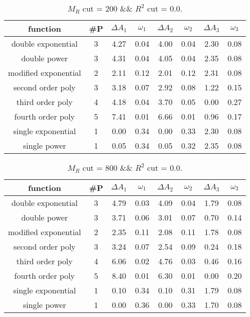  
\begin{table}[H] 
\begin{center} 
\begin{tabular}{|c|c|cc|cc|cc|} 
\hline function & \#P & $\Delta A_1$ & $\omega_1$ & $\Delta A_2$ & $\omega_2$ & $\Delta A_3$ & $\omega_3$ \\ \hline 
double exponential &  3 &   4.27 &   0.04 &   4.00 &   0.04 &   2.30 &   0.08 \\ 
double power &  3 &   4.31 &   0.04 &   4.05 &   0.04 &   2.35 &   0.08 \\ 
modified exponential &  2 &   2.11 &   0.12 &   2.01 &   0.12 &   2.31 &   0.08 \\ 
second order poly &  3 &   3.18 &   0.07 &   2.92 &   0.08 &   1.22 &   0.15 \\ 
third order poly &  4 &   4.18 &   0.04 &   3.70 &   0.05 &   0.00 &   0.27 \\ 
fourth order poly &  5 &   7.41 &   0.01 &   6.66 &   0.01 &   0.96 &   0.17 \\ 
single exponential &  1 &   0.00 &   0.34 &   0.00 &   0.33 &   2.30 &   0.08 \\ 
single power &  1 &   0.05 &   0.34 &   0.05 &   0.32 &   2.35 &   0.08 \\ 
\hline 
\end{tabular} 
\caption{$M_R$ cut = 200 \&\& $R^2$ cut = 0.0.} 
\label{tab:FitChoices_200_0.0} 
\end{center} 
\end{table} 
 
 
\begin{table}[H] 
\begin{center} 
\begin{tabular}{|c|c|cc|cc|cc|} 
\hline function & \#P & $\Delta A_1$ & $\omega_1$ & $\Delta A_2$ & $\omega_2$ & $\Delta A_3$ & $\omega_3$ \\ \hline 
double exponential &  3 &   4.79 &   0.03 &   4.09 &   0.04 &   1.79 &   0.08 \\ 
double power &  3 &   3.71 &   0.06 &   3.01 &   0.07 &   0.70 &   0.14 \\ 
modified exponential &  2 &   2.35 &   0.11 &   2.08 &   0.11 &   1.78 &   0.08 \\ 
second order poly &  3 &   3.24 &   0.07 &   2.54 &   0.09 &   0.24 &   0.18 \\ 
third order poly &  4 &   6.06 &   0.02 &   4.76 &   0.03 &   0.46 &   0.16 \\ 
fourth order poly &  5 &   8.40 &   0.01 &   6.30 &   0.01 &   0.00 &   0.20 \\ 
single exponential &  1 &   0.10 &   0.34 &   0.10 &   0.31 &   1.79 &   0.08 \\ 
single power &  1 &   0.00 &   0.36 &   0.00 &   0.33 &   1.70 &   0.08 \\ 
\hline 
\end{tabular} 
\caption{$M_R$ cut = 800 \&\& $R^2$ cut = 0.0.} 
\label{tab:FitChoices_800_0.0} 
\end{center} 
\end{table} 
 
